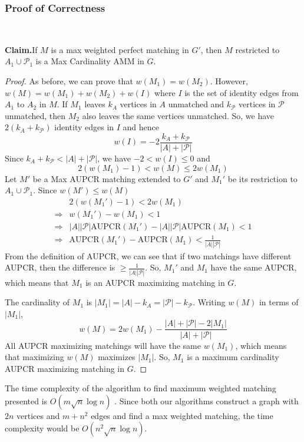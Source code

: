 \documentclass[letterpaper]{article} %
\newenvironment{claim}[1]{\par\noindent\textbf{Claim.}\space#1}{}
\begin{document}
\subsubsection{Proof of Correctness} ~\\
\begin{claim}
If $M$ is a max weighted perfect matching in $G'$, then $M$ restricted to $A_1 \cup \mathcal{P}_1$ is a Max Cardinality AMM in $G$.
\end{claim}
\begin{proof}
As before, we can prove that $w(M_1) = w(M_2)$. However, $w(M) = w(M_1) + w(M_2) + w(I)$ where $I$ is the set of identity edges from $A_1$ to $A_2$ in $M$. If $M_1$ leaves $k_A$ vertices in $A$ unmatched and $k_{\mathcal{P}}$ vertices in $\mathcal{P}$ unmatched, then $M_2$ also leaves the same vertices unmatched. So, we have $2(k_A + k_{\mathcal{P}})$ identity edges in $I$ and hence $$w(I) = -2\frac{k_A+k_{\mathcal{P}}}{|A|+|\mathcal{P}|}$$
Since $k_A + k_{\mathcal{P}} < |A| + |\mathcal{P}|$, we have $-2 < w(I) \le 0$ and
$$2(w(M_1)-1) < w(M) \le 2w(M_1)$$
Let $M'$ be a Max AUPCR matching extended to $G'$ and $M_1'$ be its restriction to $A_1 \cup \mathcal{P}_1$. Since $w(M') \le w(M)$
\begin{align*}
	& 2(w(M_1')-1) < 2w(M_1) \\
    \Rightarrow & w(M_1') - w(M_1) < 1 \\
    \Rightarrow & |A||\mathcal{P}|\text{AUPCR}(M_1') - |A||\mathcal{P}|\text{AUPCR}(M_1) < 1\\
    \Rightarrow & \text{AUPCR}(M_1') - \text{AUPCR}(M_1) < \frac{1}{|A||\mathcal{P}|}
\end{align*}
From the definition of AUPCR, we can see that if two matchings have different AUPCR, then the difference is $\ge \frac{1}{|A| |\mathcal{P}|}$. So, $M_1'$ and $M_1$ have the same AUPCR, which means that $M_1$ is an AUPCR maximizing matching in $G$.

The cardinality of $M_1$ is $|M_1| = |A|-k_A = |\mathcal{P}|-k_{\mathcal{P}}$. Writing $w(M)$ in terms of $|M_1|$,
$$w(M) = 2w(M_1) - \frac{|A|+|\mathcal{P}|-2|M_1|}{|A|+|\mathcal{P}|}$$
  All AUPCR maximizing matchings will have the same $w(M_1)$, which means that maximizing $w(M)$ maximizes $|M_1|$. So, $M_1$ is a maximum cardinality AUPCR maximizing matching in $G$.
\end{proof}

The time complexity of the algorithm to find maximum weighted matching presented is $O(m\sqrt{n}\log n)$ \cite{maxweight}. Since both our algorithms construct a graph with $2n$ vertices and $m + n^2$ edges and find a max weighted matching, the time complexity would be $O(n^2\sqrt{n}\log n)$.
\end{document}
